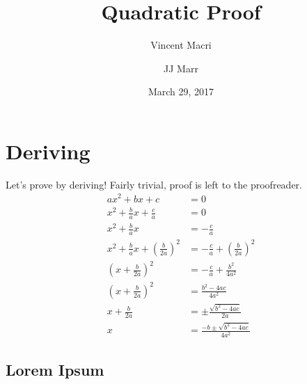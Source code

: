 \documentclass[12pt]{article} %
\title{Quadratic Proof} %
\author{Vincent Macri \and JJ Marr} %
\date{March 29, 2017} %
\begin{document}
	\maketitle %
	\tableofcontents %
	\newpage %
	\section{Deriving} %
	Let's prove by deriving!
	Fairly trivial, proof is left to the proofreader.
	\begin{align}
		ax^2 + bx + c &= 0\\ %
		x^2 + \frac{b}{a}x + \frac{c}{a} &= 0\\ %
		x^2 + \frac{b}{a}x &= - \frac{c}{a}\\ %
		x^2 + \frac{b}{a}x + (\frac{b}{2a})^2&= - \frac{c}{a} + (\frac{b}{2a})^2\\ %
		(x + \frac{b}{2a})^2 &= - \frac{c}{a} + \frac{b^2}{4a^2}\\ %
		(x + \frac{b}{2a})^2 &= \frac{b^2 - 4ac}{4a^2}\\ %
		x + \frac{b}{2a}&= \pm\frac{\sqrt{b^2 - 4ac}}{2a}\\ %
		x&= \frac{- b \pm \sqrt{b^2 - 4ac}}{4a^2} %
	\end{align}
	\subsection{Lorem Ipsum}
	\lipsum[4-57]
\end{document}
